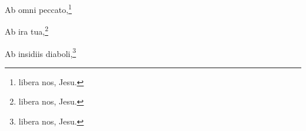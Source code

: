 \documentclass{scrbook}
\begin{document}
Ab omni peccato,\footnote{libera nos, Jesu.\label{libera}}

Ab ira tua,\footnote{libera nos, Jesu.\label{libera}}

Ab insidiis diaboli,\footnote{libera nos, Jesu.\label{libera}}
\end{document}
